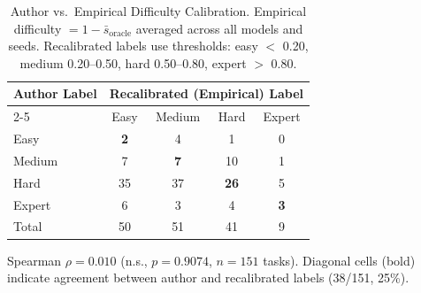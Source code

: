\begin{table}[htbp]
\centering
\caption{Author vs.\ Empirical Difficulty Calibration. Empirical difficulty $= 1 - \bar{s}_{\text{oracle}}$ averaged across all models and seeds. Recalibrated labels use thresholds: easy $<$ 0.20, medium 0.20--0.50, hard 0.50--0.80, expert $>$ 0.80.}
\label{tab:difficulty_calibration}
\small
\begin{tabular}{lcccc}
\toprule
Author Label & \multicolumn{4}{c}{Recalibrated (Empirical) Label} \\
\cmidrule(lr){2-5}
 & Easy & Medium & Hard & Expert \\
\midrule
Easy & \textbf{2} & 4 & 1 & 0 \\
Medium & 7 & \textbf{7} & 10 & 1 \\
Hard & 35 & 37 & \textbf{26} & 5 \\
Expert & 6 & 3 & 4 & \textbf{3} \\
\midrule
Total & 50 & 51 & 41 & 9 \\
\bottomrule
\end{tabular}
\vspace{2pt}
{\footnotesize Spearman $\rho = 0.010$ (n.s., $p = 0.9074$, $n = 151$ tasks). Diagonal cells (bold) indicate agreement between author and recalibrated labels (38/151, 25\%).}
\end{table}
